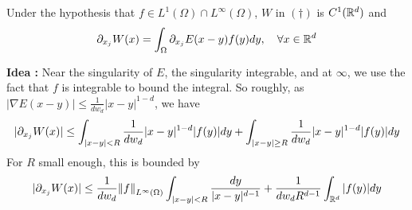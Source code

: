 \documentclass[12pt,a4paper]{article}
\newenvironment{proof}
{\begin{changemargin}{0.5cm}{0.5cm} 
	}%
	{\end{changemargin}
}
\newenvironment{p}
{\begin{proof} 
	}%
	{\end{proof}
}
\begin{document}
 Under the hypothesis that $f\in L^1(\Omega) \cap L^{\infty}(\Omega)$, $W$ in $(\dagger)$ is $C^1(\mathbb{R}^d)$ and
\begin{align*}
\partial_{x_j} W(x) = \int_{\Omega} \partial_{x_j} E(x-y) f(y) dy, \quad \forall x\in \mathbb{R}^d
\end{align*}
\begin{p}
\textbf{Idea :} Near the singularity of $E$, the singularity integrable, and at $\infty$, we use the fact that $f$ is integrable to bound the integral. So roughly, as $|\nabla E(x-y)| \leq \frac{1}{dw_d} |x-y|^{1-d}$, we have
\begin{align*}
|\partial_{x_j} W(x)| \leq \int_{|x-y|<R} \frac{1}{dw_d} |x-y|^{1-d} |f(y)| dy + \int_{|x-y|\geq R} \frac{1}{dw_d} |x-y|^{1-d} |f(y)|dy
\end{align*}
For $R$ small enough, this is bounded by
\begin{align*}
|\pa_{x_j} W(x)| \leq \frac{1}{dw_d} \snorms{f}{L^{\infty}(\Omega)} \int_{|x-y|< R} \frac{dy}{|x-y|^{d-1}} + \frac{1}{dw_d R^{d-1}} \int_{\reals^{d}} |f(y)| dy
\end{align*}



\end{p}
\end{document}
